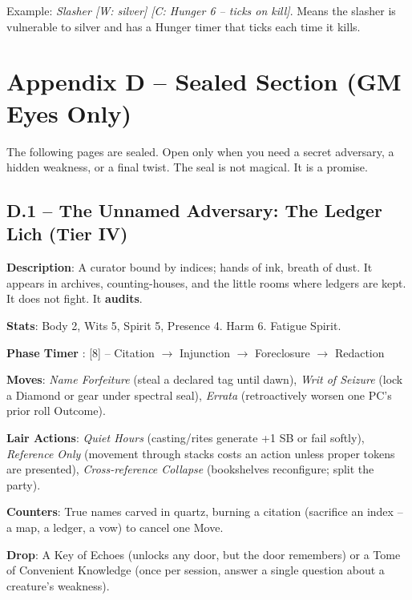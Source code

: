 \noindent Example: \emph{Slasher [W: silver] [C: Hunger 6 -- ticks on kill]}. Means the slasher is vulnerable to silver and has a Hunger timer that ticks each time it kills.


\section*{Appendix D -- Sealed Section (GM Eyes Only)}

\noindent The following pages are sealed. Open only when you need a secret adversary, a hidden weakness, or a final twist. The seal is not magical. It is a promise.

\subsection*{D.1 -- The Unnamed Adversary: The Ledger Lich (Tier IV)}

\noindent\textbf{Description}: A curator bound by indices; hands of ink, breath of dust. It appears in archives, counting-houses, and the little rooms where ledgers are kept. It does not fight. It \textbf{audits}.

\noindent\textbf{Stats}: Body 2, Wits 5, Spirit 5, Presence 4. Harm 6. Fatigue Spirit.

\noindent\textbf{Phase Timer }: [8] -- Citation $\rightarrow$ Injunction $\rightarrow$ Foreclosure $\rightarrow$ Redaction

\noindent\textbf{Moves}: \emph{Name Forfeiture} (steal a declared tag until dawn), \emph{Writ of Seizure} (lock a Diamond or gear under spectral seal), \emph{Errata} (retroactively worsen one PC's prior roll Outcome).

\noindent\textbf{Lair Actions}: \emph{Quiet Hours} (casting/rites generate +1 SB or fail softly), \emph{Reference Only} (movement through stacks costs an action unless proper tokens are presented), \emph{Cross-reference Collapse} (bookshelves reconfigure; split the party).

\noindent\textbf{Counters}: True names carved in quartz, burning a citation (sacrifice an index -- a map, a ledger, a vow) to cancel one Move.

\noindent\textbf{Drop}: A Key of Echoes (unlocks any door, but the door remembers) or a Tome of Convenient Knowledge (once per session, answer a single question about a creature's weakness).


